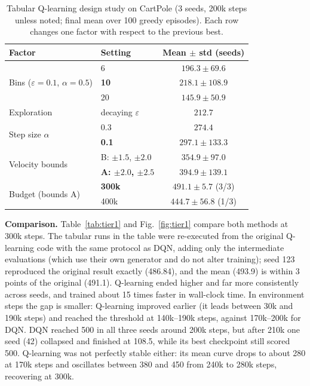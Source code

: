 \documentclass[10pt,twocolumn,letterpaper]{article}
\newcommand{\eps}{\varepsilon}
\begin{document}
\begin{table}[t]
\centering
\caption{Tabular Q-learning design study on CartPole (3 seeds, 200k steps unless noted; final mean over 100 greedy episodes). Each row changes one factor with respect to the previous best.}
\label{tab:qdesign}
\small
\setlength{\tabcolsep}{4pt}
\begin{tabular}{@{}llc@{}}
\toprule
Factor & Setting & Mean $\pm$ std (seeds) \\
\midrule
\multirow{3}{*}{Bins ($\eps=0.1$, $\alpha=0.5$)} & 6  & $196.3\pm69.6$ \\
                                          & \textbf{10} & $\mathbf{218.1\pm108.9}$ \\
                                          & 20 & $145.9\pm50.9$ \\
\midrule
Exploration & decaying $\eps$ & $212.7$ \\
\midrule
\multirow{2}{*}{Step size $\alpha$} & 0.3 & $274.4$ \\
                                    & \textbf{0.1} & $\mathbf{297.1\pm133.3}$ \\
\midrule
\multirow{2}{*}{Velocity bounds} & B: $\pm1.5$, $\pm2.0$ & $354.9\pm97.0$ \\
                                 & \textbf{A: $\pm2.0$, $\pm2.5$} & $\mathbf{394.9\pm139.1}$ \\
\midrule
\multirow{2}{*}{Budget (bounds A)} & \textbf{300k} & $\mathbf{491.1\pm5.7}$ (3/3) \\
                                   & 400k & $444.7\pm56.8$ (1/3) \\
\bottomrule
\end{tabular}
\end{table}

\textbf{Comparison.} Table~\ref{tab:tier1} and Fig.~\ref{fig:tier1} compare both methods at 300k steps. The tabular runs in the table were re-executed from the original Q-learning code with the same protocol as DQN, adding only the intermediate evaluations (which use their own generator and do not alter training); seed 123 reproduced the original result exactly (486.84), and the mean (493.9) is within 3 points of the original (491.1). Q-learning ended higher and far more consistently across seeds, and trained about 15 times faster in wall-clock time. In environment steps the gap is smaller: Q-learning improved earlier (it leads between 30k and 190k steps) and reached the threshold at 140k--190k steps, against 170k--200k for DQN. DQN reached 500 in all three seeds around 200k steps, but after 210k one seed (42) collapsed and finished at 108.5, while its best checkpoint still scored 500. Q-learning was not perfectly stable either: its mean curve drops to about 280 at 170k steps and oscillates between 380 and 450 from 240k to 280k steps, recovering at 300k.
\end{document}
